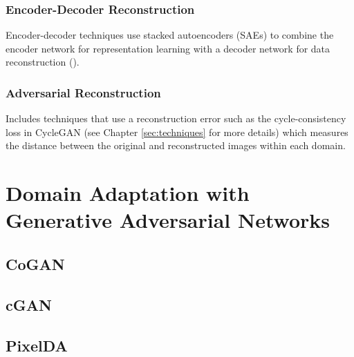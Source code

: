 \subsubsection{Encoder-Decoder Reconstruction}
Encoder-decoder techniques use stacked autoencoders (SAEs) to combine the encoder network for representation learning with a decoder network for data reconstruction ().

\subsubsection{Adversarial Reconstruction}
Includes techniques that use a reconstruction error such as the cycle-consistency loss in CycleGAN (see Chapter \ref{sec:techniques} for more details) which measures the distance between the original and reconstructed images within each domain. 





\section{Domain Adaptation with Generative Adversarial Networks}
\label{sec:DA_with_GANs}
\subsection{CoGAN}
\cite{DBLP:journals/corr/0001T16}

\subsection{cGAN}
\cite{DBLP:journals/corr/IsolaZZE16}

\subsection{PixelDA}
\cite{DBLP:journals/corr/BousmalisSDEK16}